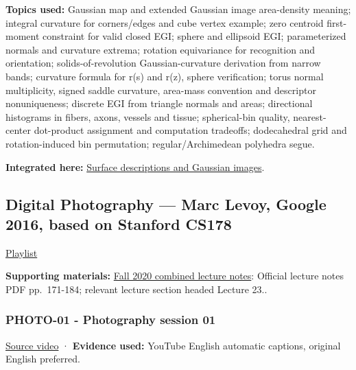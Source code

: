 \textbf{Topics used:} Gaussian map and extended Gaussian image area-density meaning; integral curvature for corners/edges and cube vertex example; zero centroid first-moment constraint for valid closed EGI; sphere and ellipsoid EGI; parameterized normals and curvature extrema; rotation equivariance for recognition and orientation; solids-of-revolution Gaussian-curvature derivation from narrow bands; curvature formula for r(s) and r(z), sphere verification; torus normal multiplicity, signed saddle curvature, area-mass convention and descriptor nonuniqueness; discrete EGI from triangle normals and areas; directional histograms in fibers, axons, vessels and tissue; spherical-bin quality, nearest-center dot-product assignment and computation tradeoffs; dodecahedral grid and rotation-induced bin permutation; regular/Archimedean polyhedra segue.

\textbf{Integrated here:} \hyperref[04-visual-computing-ii-ch032-surface-descriptions-and-gaussian-images]{Surface descriptions and Gaussian images}.

\subsection{Digital Photography --- Marc Levoy, Google 2016, based on Stanford CS178}\label{04-visual-computing-ii-ch036-digital-photography-marc-levoy-google-2016-based-on-stanford-cs178}

\hypertarget{04-visual-computing-ii-ch036-digital-photography-marc-levoy-google-2016-based-on-stanford-cs178}{}

\href{https://www.youtube.com/playlist?list=PL7ddpXYvFXspUN0N-gObF1GXoCA-DA-7i}{Playlist}

\textbf{Supporting materials:} \href{https://ocw.mit.edu/courses/6-801-machine-vision-fall-2020/9ec44f69e72995c370b3797818ba01e6_MIT6_801F20_lectureNotes.pdf}{Fall 2020 combined lecture notes}: Official lecture notes PDF pp.~171-184; relevant lecture section headed Lecture 23..

\subsubsection{PHOTO-01 - Photography session 01}\label{04-visual-computing-ii-ch036-photo-01---photography-session-01}

\hypertarget{04-visual-computing-ii-ch036-photo-01---photography-session-01}{}

\href{https://www.youtube.com/watch?v=y7HrM-fk_Rc}{Source video} · \textbf{Evidence used:} YouTube English automatic captions, original English preferred.

